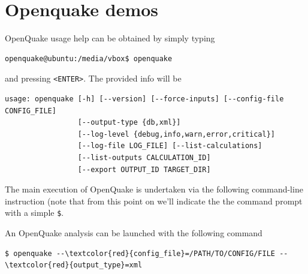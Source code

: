 \section{Openquake demos}
%
OpenQuake usage help can be obtained by simply typing
\begin{Verbatim}[frame=single, commandchars=\\\{\}, fontsize=\small]
openquake@ubuntu:/media/vbox$ openquake 
\end{Verbatim}
and pressing \texttt{<ENTER>}. The provided info will be 
\begin{Verbatim}[frame=single, commandchars=\\\{\}, fontsize=\small]
usage: openquake [-h] [--version] [--force-inputs] [--config-file CONFIG_FILE]
                 [--output-type {db,xml}]
                 [--log-level {debug,info,warn,error,critical}]
                 [--log-file LOG_FILE] [--list-calculations]
                 [--list-outputs CALCULATION_ID]
                 [--export OUTPUT_ID TARGET_DIR] 
\end{Verbatim}
The main execution of OpenQuake is undertaken via the following 
command-line instruction (note that from this point on we'll indicate the 
the command prompt with a simple \texttt{\$}.

An OpenQuake analysis can be launched with the following command
\begin{Verbatim}[frame=single, commandchars=\\\{\}, fontsize=\small]
$ openquake --\textcolor{red}{config_file}=/PATH/TO/CONFIG/FILE --\textcolor{red}{output_type}=xml
\end{Verbatim}
%
\clearpage
